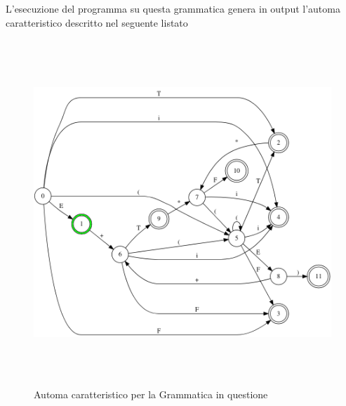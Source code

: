 \documentclass[12pt]{article}
\begin{document}
L'esecuzione del programma su questa grammatica genera in output l'automa caratteristico descritto nel seguente listato

\begin{figure}[h]
  \includegraphics[height=13cm, keepaspectratio]{assets/automa3.png}
  \caption{Automa caratteristico per la Grammatica in questione}
  \label{fig:automa1}
\end{figure}
\end{document}
